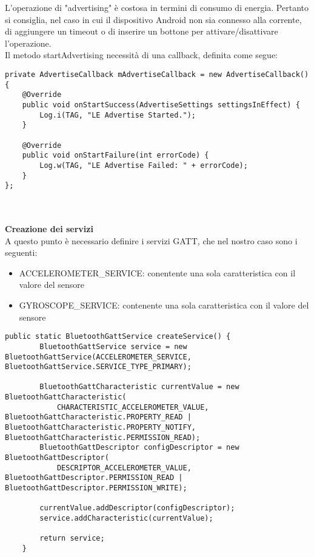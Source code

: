 \documentclass{article}
\begin{document}
L'operazione di "advertising" è costosa in termini di consumo di energia. Pertanto si consiglia, nel caso in cui il dispositivo Android non sia connesso alla corrente, di aggiungere un timeout o di inserire un bottone per attivare/disattivare l'operazione.\\
Il metodo startAdvertising necessità di una callback, definita come segue:
\begin{lstlisting}
private AdvertiseCallback mAdvertiseCallback = new AdvertiseCallback() {
    @Override
    public void onStartSuccess(AdvertiseSettings settingsInEffect) {
        Log.i(TAG, "LE Advertise Started.");
    }

    @Override
    public void onStartFailure(int errorCode) {
        Log.w(TAG, "LE Advertise Failed: " + errorCode);
    }
};
\end{lstlisting}
\\ \\ \textbf{Creazione dei servizi}\\
A questo punto è necessario definire i servizi GATT, che nel nostro caso sono i seguenti:
\begin{itemize}
    \item ACCELEROMETER\_SERVICE: conentente una sola caratteristica con il valore del sensore
    \item GYROSCOPE\_SERVICE: contenente una sola caratteristica con il valore del sensore
\end{itemize} 
\newpage
\begin{lstlisting}
public static BluetoothGattService createService() {
        BluetoothGattService service = new BluetoothGattService(ACCELEROMETER_SERVICE, BluetoothGattService.SERVICE_TYPE_PRIMARY);

        BluetoothGattCharacteristic currentValue = new BluetoothGattCharacteristic(
            CHARACTERISTIC_ACCELEROMETER_VALUE, BluetoothGattCharacteristic.PROPERTY_READ | BluetoothGattCharacteristic.PROPERTY_NOTIFY, BluetoothGattCharacteristic.PERMISSION_READ);
        BluetoothGattDescriptor configDescriptor = new BluetoothGattDescriptor(
            DESCRIPTOR_ACCELEROMETER_VALUE, BluetoothGattDescriptor.PERMISSION_READ | BluetoothGattDescriptor.PERMISSION_WRITE);

        currentValue.addDescriptor(configDescriptor);
        service.addCharacteristic(currentValue);

        return service;
    }
\end{lstlisting}
\end{document}
